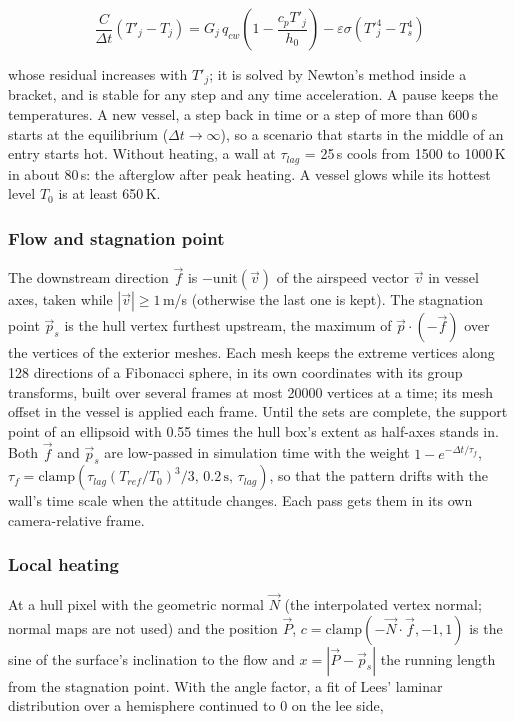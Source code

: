 \documentclass[Orbiter Technical Reference.tex]{subfiles}
\begin{document}
\begin{sloppypar}
\[ \frac{C}{\Delta t}\left(T'_{j} - T_{j}\right) = G_{j}\,q_{cw}\left(1 - \frac{c_{p}T'_{j}}{h_{0}}\right) - \varepsilon\sigma\left(T'^{4}_{j} - T_{s}^{4}\right) \]

\noindent
whose residual increases with $T'_{j}$; it is solved by Newton's method inside a bracket, and is stable for any step and any time acceleration. A pause keeps the temperatures. A new vessel, a step back in time or a step of more than 600\,s starts at the equilibrium ($\Delta t \rightarrow \infty$), so a scenario that starts in the middle of an entry starts hot. Without heating, a wall at $\tau_{lag}$ = 25\,s cools from 1500 to 1000\,K in about 80\,s: the afterglow after peak heating. A vessel glows while its hottest level $T_{0}$ is at least 650\,K.

\subsubsection{Flow and stagnation point}
The downstream direction $\vec{f}$ is $-\mathrm{unit}(\vec{v})$ of the airspeed vector $\vec{v}$ in vessel axes, taken while $|\vec{v}| \ge 1$\,m/s (otherwise the last one is kept). The stagnation point $\vec{p}_{s}$ is the hull vertex furthest upstream, the maximum of $\vec{p}\cdot(-\vec{f})$ over the vertices of the exterior meshes. Each mesh keeps the extreme vertices along 128 directions of a Fibonacci sphere, in its own coordinates with its group transforms, built over several frames at most 20000 vertices at a time; its mesh offset in the vessel is applied each frame. Until the sets are complete, the support point of an ellipsoid with 0.55 times the hull box's extent as half-axes stands in. Both $\vec{f}$ and $\vec{p}_{s}$ are low-passed in simulation time with the weight $1 - e^{-\Delta t/\tau_{f}}$, $\tau_{f} = \mathrm{clamp}(\tau_{lag}(T_{ref}/T_{0})^{3}/3,\, 0.2\,\mathrm{s},\, \tau_{lag})$, so that the pattern drifts with the wall's time scale when the attitude changes. Each pass gets them in its own camera-relative frame.

\subsubsection{Local heating}
At a hull pixel with the geometric normal $\vec{N}$ (the interpolated vertex normal; normal maps are not used) and the position $\vec{P}$, $c = \mathrm{clamp}(-\vec{N}\cdot\vec{f}, -1, 1)$ is the sine of the surface's inclination to the flow and $x = |\vec{P} - \vec{p}_{s}|$ the running length from the stagnation point. With the angle factor, a fit of Lees' laminar distribution over a hemisphere \cite{lees1956} continued to 0 on the lee side,


\end{sloppypar}
\end{document}
